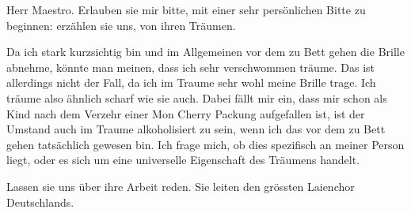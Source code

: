 Herr Maestro. Erlauben sie mir bitte, mit einer sehr persönlichen Bitte zu beginnen: erzählen sie uns, von ihren Träumen.

Da ich stark kurzsichtig bin und im Allgemeinen vor dem zu Bett gehen die Brille abnehme, könnte man meinen, dass ich sehr verschwommen träume. Das ist allerdings nicht der Fall, da ich im Traume sehr wohl meine Brille trage. Ich träume also ähnlich scharf wie sie auch. Dabei fällt mir ein, dass mir schon als Kind nach dem Verzehr einer Mon Cherry Packung aufgefallen ist, ist der Umstand auch im Traume alkoholisiert zu sein, wenn ich das vor dem zu Bett gehen tatsächlich gewesen bin. Ich frage mich, ob dies spezifisch an meiner Person liegt, oder es sich um eine universelle Eigenschaft des Träumens handelt.



Lassen sie uns über ihre Arbeit reden. Sie leiten den grössten Laienchor Deutschlands.
